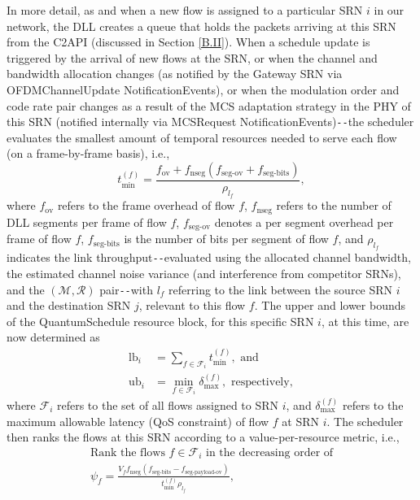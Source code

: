 In more detail, as and when a new flow is assigned to a particular SRN $i$ in our network, the DLL creates a queue that holds the packets arriving at this SRN from the C2API (discussed in Section \ref{B.II}). When a schedule update is triggered by the arrival of new flows at the SRN, or when the channel and bandwidth allocation changes (as notified by the Gateway SRN via OFDMChannelUpdate NotificationEvents), or when the modulation order and code rate pair changes as a result of the MCS adaptation strategy in the PHY of this SRN (notified internally via MCSRequest NotificationEvents)\texttt{-{}-}the scheduler evaluates the smallest amount of temporal resources needed to serve each flow (on a frame-by-frame basis), i.e.,
\begin{equation}\label{B.8}
    t_{\text{min}}^{(f)}=\frac{f_{\text{ov}}+f_{\text{nseg}}(f_{\text{seg-ov}}+f_{\text{seg-bits}})}{\rho_{l_{f}}},
\end{equation}
where $f_{\text{ov}}$ refers to the frame overhead of flow $f$, $f_{\text{nseg}}$ refers to the number of DLL segments per frame of flow $f$, $f_{\text{seg-ov}}$ denotes a per segment overhead per frame of flow $f$, $f_{\text{seg-bits}}$ is the number of bits per segment of flow $f$, and $\rho_{l_{f}}$ indicates the link throughput\texttt{-{}-}evaluated using the allocated channel bandwidth, the estimated channel noise variance (and interference from competitor SRNs), and the $(\mathcal{M},\mathcal{R})$ pair\texttt{-{}-}with $l_{f}$ referring to the link between the source SRN $i$ and the destination SRN $j$, relevant to this flow $f$. The upper and lower bounds of the QuantumSchedule resource block, for this specific SRN $i$, at this time, are now determined as
\begin{equation}\label{B.9}
    \begin{aligned}
        \text{lb}_{i}&=\sum_{f \in \mathcal{F}_{i}}t_{\text{min}}^{(f)},\text{ and}\\
        \text{ub}_{i}&=\min_{f \in \mathcal{F}_{i}}\delta_{\text{max}}^{(f)},\text{ respectively},
    \end{aligned}
\end{equation}
where $\mathcal{F}_{i}$ refers to the set of all flows assigned to SRN $i$, and $\delta_{\text{max}}^{(f)}$ refers to the maximum allowable latency (QoS constraint) of flow $f$ at SRN $i$. The scheduler then ranks the flows at this SRN according to a value-per-resource metric, i.e., 
\begin{equation}\label{B.10}
    \begin{aligned}
        \text{Rank the flows $f \in \mathcal{F}_{i}$ in the decreasing order of}\\
        \psi_{f}=\frac{V_{f}f_{\text{nseg}}(f_{\text{seg-bits}}-f_{\text{seg-payload-ov}})}{t_{\text{min}}^{(f)}\rho_{l_{f}}},
    \end{aligned}
\end{equation}
